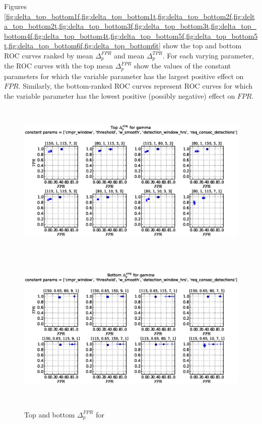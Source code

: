 \clearpage
Figures \ref{fig:delta_top_bottom1f,fig:delta_top_bottom1t,fig:delta_top_bottom2f,fig:delta_top_bottom2t,fig:delta_top_bottom3f,fig:delta_top_bottom3t,fig:delta_top_bottom4f,fig:delta_top_bottom4t,fig:delta_top_bottom5f,fig:delta_top_bottom5t,fig:delta_top_bottom6f,fig:delta_top_bottom6t} show the top and bottom ROC curves ranked by mean $\Delta_p^{FPR}$ and mean $\Delta_p^{TPR}$. For each varying parameter, the ROC curves with the top mean $\Delta_p^{FPR}$ show the values of the constant parameters for which the variable parameter has the largest positive effect on $FPR$. Similarly, the bottom-ranked ROC curves represent ROC curves for which the variable parameter has the lowest positive (possibly negative) effect on $FPR$.

\begin{figure}[!h]
\begin{center}
\includegraphics[height=3in]{../fig/final/top_fpr/gamma}
\includegraphics[height=3in]{../fig/final/bottom_fpr/gamma}
\end{center}
\caption{\label{fig:delta_top_bottom1f} Top and bottom $\Delta_p^{FPR}$ for }
\end{figure}


